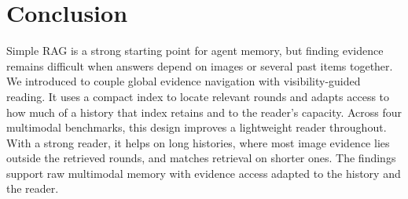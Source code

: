 \section{Conclusion}
\label{sec:conclusion}

Simple RAG is a strong starting point for agent memory, but finding evidence remains difficult when answers depend on images or several past items together. We introduced \vgs{} to couple global evidence navigation with visibility-guided reading. It uses a compact index to locate relevant rounds and adapts access to how much of a history that index retains and to the reader's capacity. Across four multimodal benchmarks, this design improves a lightweight reader throughout. With a strong reader, it helps on long histories, where most image evidence lies outside the retrieved rounds, and matches retrieval on shorter ones. The findings support raw multimodal memory with evidence access adapted to the history and the reader.
